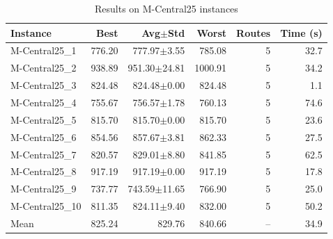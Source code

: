 \begin{table}[htbp]
\centering
\caption{Results on M-Central25 instances}
\label{tab:m-central25}
\begin{tabular}{lrrrrr}
\toprule
Instance & Best & Avg$\pm$Std & Worst & Routes & Time (s) \\
\midrule
M-Central25_1 & 776.20 & 777.97$\pm$3.55 & 785.08 & 5 & 32.7 \\
M-Central25_2 & 938.89 & 951.30$\pm$24.81 & 1000.91 & 5 & 34.2 \\
M-Central25_3 & 824.48 & 824.48$\pm$0.00 & 824.48 & 5 & 1.1 \\
M-Central25_4 & 755.67 & 756.57$\pm$1.78 & 760.13 & 5 & 74.6 \\
M-Central25_5 & 815.70 & 815.70$\pm$0.00 & 815.70 & 5 & 23.6 \\
M-Central25_6 & 854.56 & 857.67$\pm$3.81 & 862.33 & 5 & 27.5 \\
M-Central25_7 & 820.57 & 829.01$\pm$8.80 & 841.85 & 5 & 62.5 \\
M-Central25_8 & 917.19 & 917.19$\pm$0.00 & 917.19 & 5 & 17.8 \\
M-Central25_9 & 737.77 & 743.59$\pm$11.65 & 766.90 & 5 & 25.0 \\
M-Central25_10 & 811.35 & 824.11$\pm$9.40 & 832.00 & 5 & 50.2 \\
\midrule
Mean & 825.24 & 829.76 & 840.66 & -- & 34.9 \\
\bottomrule
\end{tabular}
\end{table}